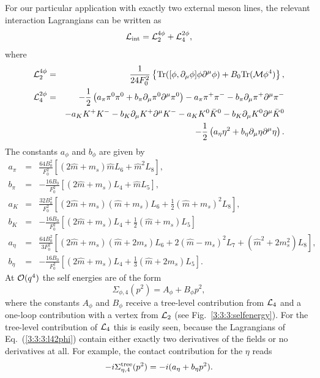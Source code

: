 \documentclass[twoside,12pt]{article}
\begin{document}
   For our particular application with exactly two external meson lines,
the relevant interaction Lagrangians can be written as
\begin{equation}
{\cal L}_{\rm int}={\cal L}_2^{4\phi}+{\cal L}_4^{2\phi},
\end{equation}
where
\begin{eqnarray}
\label{3:3:3:l24phi} {\cal L}^{4\phi}_2&=&\frac{1}{24
F^2_0}\left\{\mbox{Tr}( [\phi,\partial_\mu \phi]\phi \partial^\mu
\phi) +B_0\mbox{Tr}({\cal M}\phi^4)\right\},\\
\label{3:3:3:l42phi}
{\cal L}_4^{2\phi}&=&
-\frac{1}{2}\left(a_\pi\pi^0\pi^0+b_\pi \partial_\mu\pi^0\partial^\mu\pi^0\right)
-a_\pi\pi^+\pi^--b_\pi\partial_\mu\pi^+\partial^\mu\pi^-\nonumber\\
&&-a_KK^+K^- - b_K\partial_\mu K^+\partial^\mu K^-
-a_KK^0\bar{K}^0 -b_K\partial_\mu K^0\partial^\mu\bar{K}^0\nonumber\\
&&-\frac{1}{2}\left(a_\eta\eta^2+b_\eta\partial_\mu\eta\partial^\mu\eta\right).
\end{eqnarray}
The constants $a_\phi$ and $ b_\phi$ are given by
\begin{eqnarray}
\label{3:3:3:ab}
a_\pi&=&\frac{64 B^2_0}{F^2_0}\left[(2\hat m+m_s)\hat mL_6+\hat m^2L_8\right],\nonumber\\
b_\pi&=&-\frac{16 B_0}{F^2_0}\left[(2\hat m+m_s)L_4+\hat mL_5\right],\nonumber\\
a_K&=&\frac{32B^2_0}{F^2_0}\left[(2\hat m+m_s)(\hat m+m_s)L_6+\frac{1}{2}(\hat m+m_s)^2L_8
\right],
\nonumber\\
b_K&=&-\frac{16 B_0}{F^2_0}\left[(2\hat m+m_s)L_4+\frac{1}{2}(\hat m+m_s)L_5\right]\nonumber\\
a_\eta&=&\frac{64 B^2_0}{3F^2_0}\left[(2\hat m+m_s)(\hat m+2m_s)L_6+2(\hat m-m_s)^2L_7
+(\hat m^2+2m_s^2)L_8\right],\nonumber\\
b_\eta&=&-\frac{16B_0}{F^2_0}\left[(2\hat m+m_s)L_4+\frac{1}{3}(\hat m+2m_s)L_5\right].
\end{eqnarray}
   At ${\cal O}(q^4)$ the self energies are of the form
\begin{equation}
\label{3:3:3:sigmaphi}
\Sigma_{\phi,4}(p^2)=A_\phi+B_\phi p^2,
\end{equation}
   where the constants $A_\phi$ and $B_\phi$ receive a tree-level
contribution from ${\cal L}_4$ and a one-loop contribution with a
vertex from ${\cal L}_2$ (see Fig.\ \ref{3:3:3:selfenergy}).
   For the tree-level contribution of ${\cal L}_4$ this is easily seen, because
the Lagrangians of Eq.\ (\ref{3:3:3:l42phi}) contain either exactly
two derivatives of the fields or no derivatives at all.
   For example, the contact contribution for the $\eta$ reads
$$-i\Sigma_{\eta,4}^{\rm tree}(p^2)=-i(a_\eta + b_\eta p^2).$$
\end{document}
